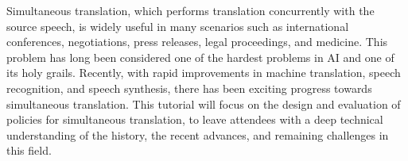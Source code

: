 Simultaneous translation, which performs translation concurrently with the source speech, is widely useful in many scenarios such as international conferences, negotiations, press releases, legal proceedings, and medicine. This problem has long been considered one of the hardest problems in AI and one of its holy grails. Recently, with rapid improvements in machine translation, speech recognition, and speech synthesis, there has been exciting progress towards simultaneous translation. This tutorial will focus on the design and evaluation of policies for simultaneous translation, to leave attendees with a deep technical understanding of the history, the recent advances, and remaining challenges in this field.
